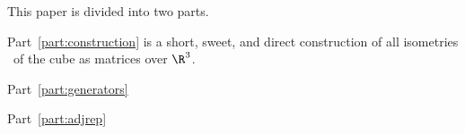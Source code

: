 This paper is divided into two parts.

Part~\ref{part:construction} is a short, sweet, and direct construction of all isometries
\IsomC\ of the cube as matrices over $\R^3$.

Part~\ref{part:generators}

Part~\ref{part:adjrep}
